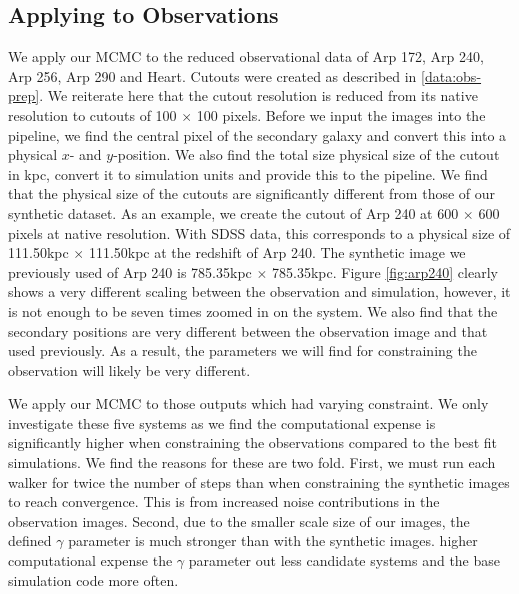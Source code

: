 \subsection{Applying to Observations}
\noindent We apply our MCMC to the reduced observational data of Arp 172, Arp 240, Arp 256, Arp 290 and Heart. Cutouts were created as described in \DIFdelbegin {}\DIFdelend \DIFaddbegin {}\DIFaddend \ref{data:obs-prep}. We reiterate here that the cutout resolution is reduced from its native resolution to cutouts of 100 $\times$ 100 pixels. Before we input the images into the pipeline, we find the central pixel of the secondary galaxy and convert this into a physical $x$- and $y$-position. We also find the total size physical size of the cutout in kpc, convert it to simulation units and provide this to the pipeline. We find that the physical size of the cutouts are significantly different from those of our synthetic dataset. As an example, we create the cutout of Arp 240 at 600 $\times$ 600 pixels at native resolution. With SDSS data, this corresponds to a physical size of 111.50kpc $\times$ 111.50kpc at the redshift of Arp 240. The synthetic image we previously used of Arp 240 is 785.35kpc $\times$ 785.35kpc. Figure \ref{fig:arp240} clearly shows a very different scaling between the observation and simulation, however, it is not enough to be seven times zoomed in on the system. We also find that the secondary positions are very different between the observation image and that used previously. As a result, the parameters we will find for constraining the observation will likely be very different. 

We apply our MCMC to those outputs which had varying constraint. We only investigate these five systems as we find the computational expense is significantly higher when constraining the observations compared to the best fit simulations. We find the reasons for these are two fold. First, we must run each walker for twice the number of steps than when constraining the synthetic images to reach convergence. This is from increased noise contributions in the observation images. Second, due to the smaller scale size of our images, the defined $\gamma$ parameter is much stronger than with the synthetic images. \DIFdelbegin {}\DIFdelend \DIFaddbegin {}\DIFaddend higher computational expense \DIFdelbegin {}\DIFdelend \DIFaddbegin {}\DIFaddend the $\gamma$ parameter \DIFdelbegin {}\DIFdelend \DIFaddbegin {}\DIFaddend out less candidate systems and \DIFdelbegin {}\DIFdelend \DIFaddbegin {}\DIFaddend the base simulation code more often.
\DIFdelbegin {}\DIFdelend 

